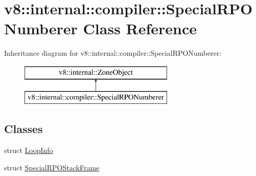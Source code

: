 \hypertarget{classv8_1_1internal_1_1compiler_1_1_special_r_p_o_numberer}{}\section{v8\+:\+:internal\+:\+:compiler\+:\+:Special\+R\+P\+O\+Numberer Class Reference}
\label{classv8_1_1internal_1_1compiler_1_1_special_r_p_o_numberer}
Inheritance diagram for v8\+:\+:internal\+:\+:compiler\+:\+:Special\+R\+P\+O\+Numberer\+:\begin{figure}[H]
\begin{center}
\leavevmode
\includegraphics[height=2.000000cm]{classv8_1_1internal_1_1compiler_1_1_special_r_p_o_numberer}
\end{center}
\end{figure}
\subsection*{Classes}
\begin{DoxyCompactItemize}
\item 
struct \hyperlink{structv8_1_1internal_1_1compiler_1_1_special_r_p_o_numberer_1_1_loop_info}{Loop\+Info}
\item 
struct \hyperlink{structv8_1_1internal_1_1compiler_1_1_special_r_p_o_numberer_1_1_special_r_p_o_stack_frame}{Special\+R\+P\+O\+Stack\+Frame}
\end{DoxyCompactItemize}
